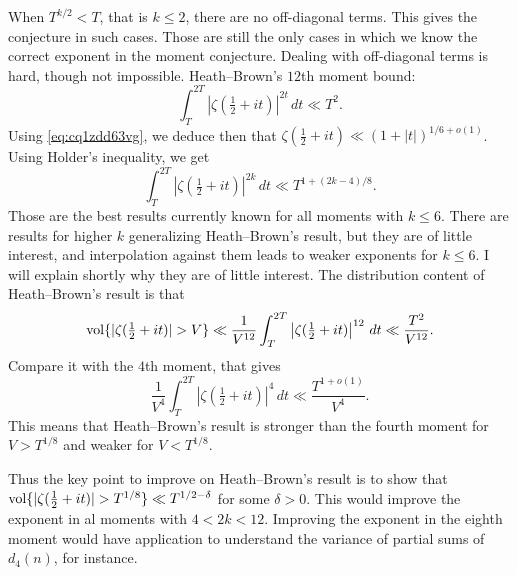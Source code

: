 \documentclass[reqno]{amsart} 
\numberwithin{theorem}{section}
\numberwithin{equation}{section}
\begin{document}
When $T^{k/2} < T$, that is $k \leq 2$, there are no off-diagonal terms.  This gives the conjecture in such cases.  Those are still the only cases in which we know the correct exponent in the moment conjecture.  Dealing with off-diagonal terms is hard, though not impossible.  Heath--Brown's $12$th moment bound:
\begin{equation*}
  \int_{T}^{2 T} \left\lvert \zeta(\tfrac{1}{2} + i t) \right\rvert^{2 t} \, d t \ll T^2.
\end{equation*}
Using \eqref{eq:cq1zdd63vg}, we deduce then that $\zeta(\tfrac{1}{2} + i t) \ll(1 + \lvert t \rvert)^{1/6 + o(1)}$.  Using Holder's inequality, we get
\begin{equation*}
  \int_{T}^{2 T} \left\lvert \zeta(\tfrac{1}{2} + i t) \right\rvert^{2 k} \, d t \ll T^{1 +(2 k - 4) / 8}.
\end{equation*}
Those are the best results currently known for all moments with $k \leq 6$.  There are results for higher $k$ generalizing Heath--Brown's result, but they are of little interest, and interpolation against them leads to weaker exponents for $k \leq 6$.  I will explain shortly why they are of little interest.  The distribution content of Heath--Brown's result is that
\begin{equation*}
  \operatorname{vol} \{\lvert \zeta(\tfrac{1}{2} + i t) \rvert > V\} \ll \frac{1}{V^{12}} \int_T^{2 T} \left\lvert \zeta(\tfrac{1}{2} + it) \right\rvert^{12} \, d t
  \ll \frac{T^2}{V^{12}}.
\end{equation*}
Compare it with the $4$th moment, that gives
\begin{equation*}
  \frac{1}{V^4} \int_T^{2 T}
  \left\lvert \zeta(\tfrac{1}{2} + i t) \right\rvert^4 \, d t
  \ll \frac{T^{1 + o(1)}}{V^4}.
\end{equation*}
This means that Heath--Brown's result is stronger than the fourth moment for $V > T^{1/8}$ and weaker for $V < T^{1/8}$.

Thus the key point to improve on Heath--Brown's result is to show that $\operatorname{vol}\{ \lvert \zeta(\tfrac{1}{2} + i t) \rvert > T^{1/8} \} \ll T^{1/2 - \delta}$ for some $\delta > 0$.  This would improve the exponent in al moments with $4 < 2 k < 12$.  Improving the exponent in the eighth moment would have application to understand the variance of partial sums of $d_4(n)$, for instance.
\end{document}
